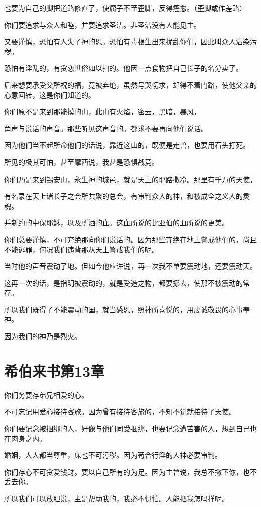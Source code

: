\documentclass[12pt,oneside]{book}
\begin{document}
也要为自己的脚把道路修直了，使瘸子不至歪脚，反得痊愈。（歪脚或作差路）

你们要追求与众人和睦，并要追求圣洁。非圣洁没有人能见主。

又要谨慎，恐怕有人失了神的恩。恐怕有毒根生出来扰乱你们，因此叫众人沾染污秽。

恐怕有淫乱的，有贪恋世俗如以扫的。他因一点食物把自己长子的名分卖了。

后来想要承受父所祝的福，竟被弃绝，虽然号哭切求，却得不着门路，使他父亲的心意回转，这是你们知道的。

你们原不是来到那能摸的山，此山有火焰，密云，黑暗，暴风，

角声与说话的声音。那些听见这声音的。都求不要再向他们说话。

因为他们当不起所命他们的话说，靠近这山的，既便是走兽，也要用石头打死。

所见的极其可怕，甚至摩西说，我甚是恐惧战竞。

你们乃是来到锡安山，永生神的城邑，就是天上的耶路撒冷。那里有千万的天使，

有名录在天上诸长子之会所共聚的总会，有审判众人的神，和被成全之义人的灵魂。

并新约的中保耶稣，以及所洒的血。这血所说的比亚伯的血所说的更美。

你们总要谨慎，不可弃绝那向你们说话的。因为那些弃绝在地上警戒他们的，尚且不能逃罪，何况我们违背那从天上警戒我们的呢。

当时他的声音震动了地。但如今他应许说，再一次我不单要震动地，还要震动天。

这再一次的话，是指明被震动的，就是受造之物，都要挪去，使那不被震动的常存。

所以我们既得了不能震动的国，就当感恩，照神所喜悦的，用虔诚敬畏的心事奉神。

因为我们的神乃是烈火。

\chapter{希伯来书第13章}
你们务要存弟兄相爱的心。

不可忘记用爱心接待客旅。因为曾有接待客旅的，不知不觉就接待了天使。

你们要记念被捆绑的人，好像与他们同受捆绑，也要记念遭苦害的人，想到自己也在肉身之内。

婚姻，人人都当尊重，床也不可污秽。因为苟合行淫的人神必要审判。

你们存心不可贪爱钱财。要以自己所有的为足。因为主曾说，我总不撇下你，也不丢去你。

所以我们可以放胆说，主是帮助我的，我必不惧怕。人能把我怎吗样呢。
\end{document}
